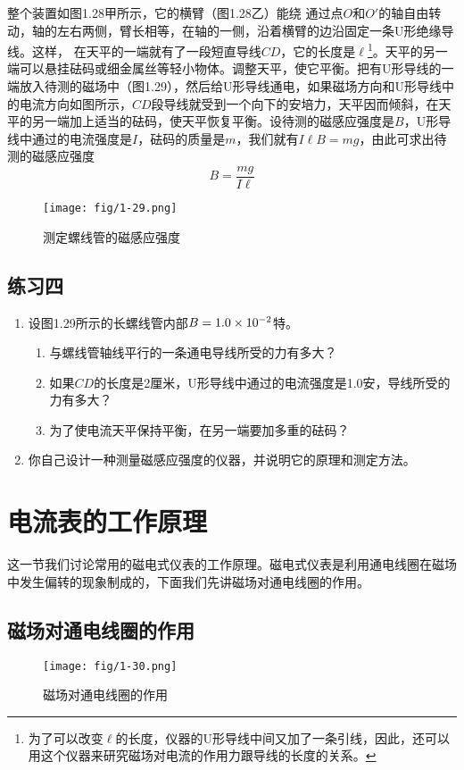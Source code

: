 整个装置如图1.28甲所示，它的横臂（图1.28乙）能绕
通过点$O$和$O'$的轴自由转动，轴的左右两侧，臂长相等，在轴的一侧，沿着横臂的边沿固定一条U形绝缘导线。这样，
在天平的一端就有了一段短直导线$CD$，它的长度是$\ell$\footnote{为了可以改变$\ell$的长度，仪器的U形导线中间又加了一条引线，因此，还可以用这个仪器来研究磁场对电流的作用力跟导线的长度的关系。}。天平的另一端可以悬挂砝码或细金属丝等轻小物体。调整天平，使它平衡。把有U形导线的一端放入待测的磁场中（图1.29），然后给U形导线通电，如果磁场方向和U形导线中的电流方向如图所示，$CD$段导线就受到一个向下的安培力，天平因而倾斜，在天平的另一端加上适当的砝码，使天平恢复平衡。设待测的磁感应强度是$B$，U形导线中通过的电流强度是$I$，砝码的质量是$m$，我们就有$I\ell B=mg$，由此可求出待测的磁感应强度
\[B=\frac{mg}{I\ell}\]
    \begin{figure}[htp]\centering
	\texttt{[image: fig/1-29.png]}
	\caption{测定螺线管的磁感应强度}
\end{figure}

\subsection*{练习四}
\begin{enumerate}
    \item 设图1.29所示的长螺线管内部$B=1.0\times10^{-2}$特。
    \begin{enumerate}
        \item 与螺线管轴线平行的一条通电导线所受的力有多大？
        \item 如果$CD$的长度是2厘米，U形导线中通过的电流强度是1.0安，导线所受的力有多大？
        \item 为了使电流天平保持平衡，在另一端要加多重的砝码？
    \end{enumerate}
    \item 你自己设计一种测量磁感应强度的仪器，并说明它的原理和测定方法。
\end{enumerate}


\section{电流表的工作原理}
这一节我们讨论常用的磁电式仪表的工作原理。磁电式仪表是利用通电线圈在磁场中发生偏转的现象制成的，下面我们先讲磁场对通电线圈的作用。

\subsection{磁场对通电线圈的作用}
    \begin{figure}[htp]\centering
	\texttt{[image: fig/1-30.png]}
	\caption{磁场对通电线圈的作用}
\end{figure}

